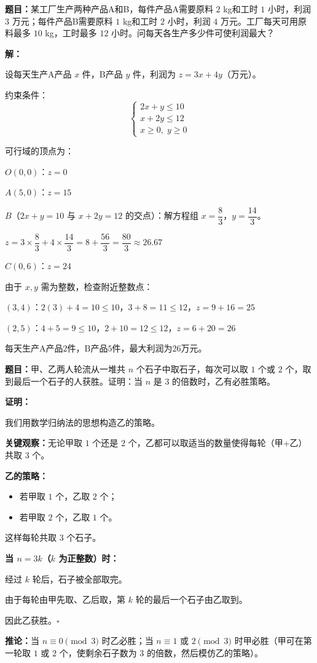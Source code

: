 \documentclass[12pt, a4paper]{ctexart}
\begin{document}
\begin{appbox}[【应用1】最优化问题中的构造]
\textbf{题目：}某工厂生产两种产品A和B，每件产品A需要原料 $2$ kg和工时 $1$ 小时，利润 $3$ 万元；每件产品B需要原料 $1$ kg和工时 $2$ 小时，利润 $4$ 万元。工厂每天可用原料最多 $10$ kg，工时最多 $12$ 小时。问每天各生产多少件可使利润最大？

\medskip
\textbf{解：}

设每天生产A产品 $x$ 件，B产品 $y$ 件，利润为 $z = 3x + 4y$（万元）。

约束条件：
$$\begin{cases} 2x + y \leq 10 \\ x + 2y \leq 12 \\ x \geq 0,\; y \geq 0 \end{cases}$$

可行域的顶点为：

$O(0, 0)$：$z = 0$

$A(5, 0)$：$z = 15$

$B$（$2x+y=10$ 与 $x+2y=12$ 的交点）：解方程组 $x = \dfrac{8}{3}$，$y = \dfrac{14}{3}$。

$z = 3 \times \dfrac{8}{3} + 4 \times \dfrac{14}{3} = 8 + \dfrac{56}{3} = \dfrac{80}{3} \approx 26.67$

$C(0, 6)$：$z = 24$

由于 $x, y$ 需为整数，检查附近整数点：

$(3, 4)$：$2(3)+4=10 \leq 10$，$3+8=11 \leq 12$，$z = 9+16 = 25$

$(2, 5)$：$4+5=9 \leq 10$，$2+10=12 \leq 12$，$z = 6+20 = 26$

$\boxed{\text{每天生产A产品2件，B产品5件，最大利润为26万元。}}$
\end{appbox}

\begin{appbox}[【应用2】存在性问题在实际中的应用]
\textbf{题目：}甲、乙两人轮流从一堆共 $n$ 个石子中取石子，每次可以取 $1$ 个或 $2$ 个，取到最后一个石子的人获胜。证明：当 $n$ 是 $3$ 的倍数时，乙有必胜策略。

\medskip
\textbf{证明：}

我们用数学归纳法的思想构造乙的策略。

\textbf{关键观察：}无论甲取 $1$ 个还是 $2$ 个，乙都可以取适当的数量使得每轮（甲+乙）共取 $3$ 个。

\textbf{乙的策略：}
\begin{itemize}[label=$\bullet$]
  \item 若甲取 $1$ 个，乙取 $2$ 个；
  \item 若甲取 $2$ 个，乙取 $1$ 个。
\end{itemize}

这样每轮共取 $3$ 个石子。

\textbf{当 $n = 3k$（$k$ 为正整数）时：}

经过 $k$ 轮后，石子被全部取完。

由于每轮由甲先取、乙后取，第 $k$ 轮的最后一个石子由乙取到。

因此乙获胜。\hfill$\square$

\medskip
\textbf{推论：}当 $n \equiv 0 \pmod{3}$ 时乙必胜；当 $n \equiv 1$ 或 $2 \pmod{3}$ 时甲必胜（甲可在第一轮取 $1$ 或 $2$ 个，使剩余石子数为 $3$ 的倍数，然后模仿乙的策略）。
\end{appbox}
\end{document}
